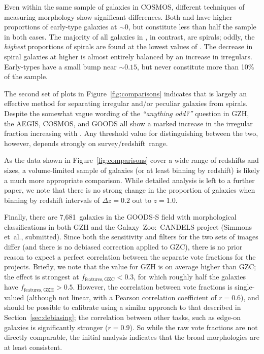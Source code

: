 \documentclass[twocolumn]{aastex6}
\begin{document}
Even within the same sample of galaxies in COSMOS, different techniques of measuring morphology show significant differences. Both \citet{cas07} and \citet{tas11} have higher proportions of early-type galaxies at \fbest$\sim0$, but constitute less than half the sample in both cases. The majority of all galaxies in \citet{sca07}, in contrast, are spirals; oddly, the \emph{highest} proportions of spirals are found at the lowest values of \fbest. The decrease in spiral galaxies at higher \fbest{} is almost entirely balanced by an increase in irregulars. Early-types have a small bump near \fbest$\sim0.15$, but never constitute more than 10\% of the sample. 

The second set of plots in Figure~\ref{fig:comparisons} indicates that \fodd{} is largely an effective method for separating irregular and/or peculiar galaxies from spirals. Despite the somewhat vague wording of the {\it ``anything odd?''} question in GZH, the AEGIS, COSMOS, and GOODS all show a marked increase in the irregular fraction increasing with \fodd. Any threshold value for distinguishing between the two, however, depends strongly on survey/redshift~range. 

As the data shown in Figure~\ref{fig:comparisons} cover a wide range of redshifts and sizes, a volume-limited sample of galaxies (or at least binning by redshift) is likely a much more appropriate comparison. While detailed analysis is left to a further paper, we note that there is no strong change in the proportion of galaxies when binning by redshift intervals of $\Delta z=0.2$ out to $z=1.0$. 

Finally, there are 7,681~galaxies in the GOODS-S field with morphological classifications in both GZH and the Galaxy~Zoo:~CANDELS project (Simmons et~al., submitted). Since both the sensitivity and filters for the two sets of images differ (and there is no debiased correction applied to GZC), there is no prior reason to expect a perfect correlation between the separate vote fractions for the projects. Briefly, we note that the \ffeatures{} value for GZH is on average higher than GZC; the effect is strongest at $f_\mathrm{features,GZC}<0.3$, for which roughly half the galaxies have $f_\mathrm{features,GZH}>0.5$. However, the correlation between vote fractions is single-valued (although not linear, with a Pearson correlation coefficient of $r=0.6$), and should be possible to calibrate using a similar approach to that described in Section~\ref{sec:debiasing}; the correlation between other tasks, such as edge-on galaxies is significantly stronger ($r=0.9$). So while the raw vote fractions are not directly comparable, the initial analysis indicates that the broad morphologies are at least consistent.
\end{document}

